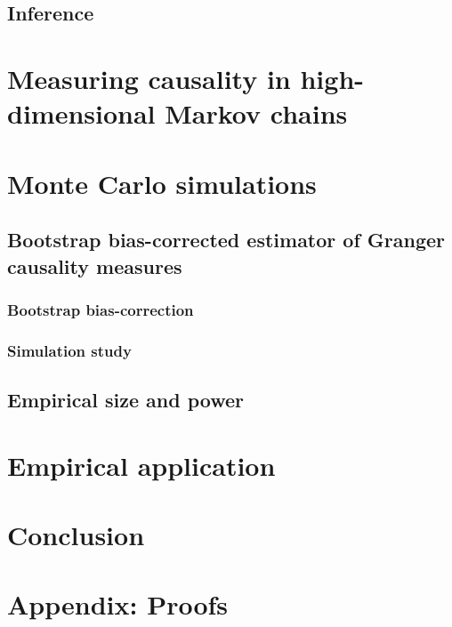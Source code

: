 \documentclass[harvard,11pt]{article}
\begin{document}
\subsection{Inference \label{Inference}}

\section{Measuring causality in high-dimensional Markov chains \label{Measuring causality in high-dimensional Markov chains}}
\section{Monte Carlo simulations \label{Monte Carlo simulations}}

\subsection{Bootstrap bias-corrected estimator of Granger causality measures \label{Bootstrap bias-corrected estimator of Granger causality measures}}

\subsubsection{Bootstrap bias-correction \label{Bootstrap bias-correction}}

\subsubsection{Simulation study \label{Simulation study}}

\subsection{Empirical size and power \label{Empirical size and power}}

\section{Empirical application\label{Empirical application}}


\section{Conclusion \label{Conclusion}}

\newpage



\newpage

\section{Appendix: Proofs \label{Appendix: Proofs}}
\end{document}

